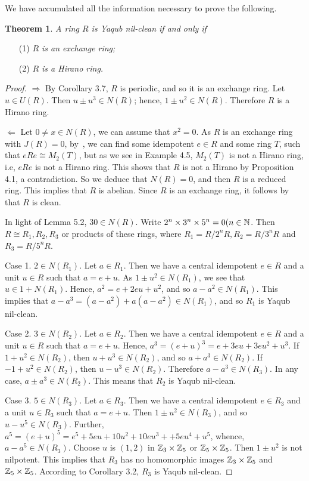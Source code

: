 \documentclass[12pt, reqno]{amsart}
\newtheorem{thm}{Theorem}[section]
\numberwithin{equation}{section}
\begin{document}
We have accumulated all the information necessary to prove the following.

\begin{thm} A ring $R$ is Yaqub nil-clean if and only if
\end{thm}
\begin{enumerate}
\item [(1)] {\it $R$ is an exchange ring;}
\vspace{-.5mm}
\item [(2)] {\it $R$ is a Hirano ring.}
\end{enumerate}
\begin{proof} $\Longrightarrow$ By Corollary 3.7, $R$ is periodic, and so it is an exchange ring. Let $u\in U(R)$. Then $u\pm u^3\in N(R)$; hence, $1\pm u^2\in N(R)$. Therefore $R$ is a Hirano ring.

$\Longleftarrow$ Let $0 \neq x\in N(R)$, we can assume that $x^2=0$. As $R$ is an exchange ring with $J(R)=0$, by~\cite[Lemma 2.7]{Z}, we can find some idempotent $e\in R$ and some ring $T$, such that $eRe\cong M_2(T)$, but as we see in Example 4.5, $M_2(T)$ is not a Hirano ring, i.e, $eRe$ is not a Hirano ring. This shows that $R$ is not a Hirano by Proposition 4.1, a contradiction. So we deduce that $N(R)=0$, and then $R$ is a reduced ring. This implies that
$R$ is abelian. Since $R$ is an exchange ring, it follows by~\cite[Proposition 1.8]{N} that $R$ is clean.

In light of Lemma 5.2, $30\in N(R)$. Write $2^n\times 3^n\times 5^n=0 (n\in {\Bbb N}$. Then $R\cong R_1, R_2, R_3$ or products of these rings, where $R_1=R/2^nR,R_2=R/3^nR$ and $R_3=R/5^nR$.

Case 1. $2\in N(R_1)$. Let $a\in R_1$. Then we have a central idempotent $e\in R$ and a unit $u\in R$ such that $a=e+u$.
As $1\pm u^2\in N(R_1)$, we see that $u\in 1+N(R_1)$. Hence, $a^2=e+2eu+u^2$, and so $a-a^2\in N(R_1)$. This implies that $a-a^3=(a-a^2)+a(a-a^2)\in N(R_1)$, and so $R_1$ is Yaqub nil-clean.

Case 2. $3\in N(R_2)$. Let $a\in R_2$. Then we have a central idempotent $e\in R$ and a unit $u\in R$ such that $a=e+u$.
Hence, $a^3=(e+u)^3=e+3eu+3eu^2+u^3$. If $1+u^2\in N(R_2)$, then $u+u^3\in N(R_2)$, and so $a+a^3\in N(R_2)$.
If $-1+u^2\in N(R_2)$, then $u-u^3\in N(R_2)$. Therefore $a-a^3\in N(R_3)$. In any case, $a\pm a^3\in N(R_2)$. This means that $R_2$ is Yaqub nil-clean.

Case 3. $5\in N(R_3)$. Let $a\in R_3$. Then we have a central idempotent $e\in R_3$ and a unit $u\in R_3$ such that $a=e+u$. Then $1\pm u^2\in N(R_3)$, and so $u-u^5\in N(R_3)$. Further, $a^5=(e+u)^5=e^5+5eu+10u^2+10eu^3++5eu^4+u^5$, whence, $a-a^5\in N(R_3)$. Choose $u$ is $(1,2)$ in ${\Bbb Z}_3\times {\Bbb Z}_5$ or
${\Bbb Z}_5\times {\Bbb Z}_5$. Then $1\pm u^2$ is not nilpotent. This implies that $R_3$ has no homomorphic images ${\Bbb Z}_3\times {\Bbb Z}_5$ and ${\Bbb Z}_5\times {\Bbb Z}_5$. According to Corollary 3.2, $R_3$ is Yaqub nil-clean.


\end{proof}
\end{document}
